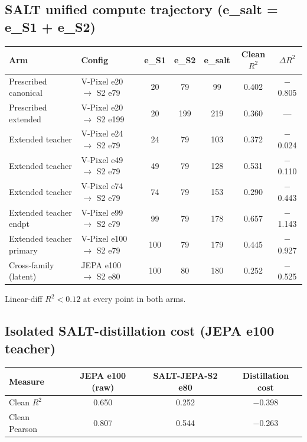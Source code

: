 \documentclass{article}
\begin{document}
\subsection{SALT unified compute trajectory (e\_salt = e\_S1 + e\_S2)}

\begin{center}
\begin{tabular}{llccccc}
\toprule
Arm & Config & e\_S1 & e\_S2 & e\_salt & Clean $R^2$ & $\Delta R^2$ \\
\midrule
Prescribed canonical & V-Pixel e20 $\to$ S2 e79 & 20 & 79 & 99  & 0.402 & $-$0.805 \\
Prescribed extended  & V-Pixel e20 $\to$ S2 e199 & 20 & 199 & 219 & 0.360 & --- \\
Extended teacher     & V-Pixel e24 $\to$ S2 e79 & 24 & 79 & 103 & 0.372 & $-$0.024 \\
Extended teacher     & V-Pixel e49 $\to$ S2 e79 & 49 & 79 & 128 & 0.531 & $-$0.110 \\
Extended teacher     & V-Pixel e74 $\to$ S2 e79 & 74 & 79 & 153 & 0.290 & $-$0.443 \\
Extended teacher endpt & V-Pixel e99 $\to$ S2 e79 & 99 & 79 & 178 & 0.657 & $-$1.143 \\
Extended teacher primary & V-Pixel e100 $\to$ S2 e79 & 100 & 79 & 179 & 0.445 & $-$0.927 \\
Cross-family (latent) & JEPA e100 $\to$ S2 e80 & 100 & 80 & 180 & 0.252 & $-$0.525 \\
\bottomrule
\end{tabular}
\end{center}

Linear-diff $R^2 < 0.12$ at every point in both arms.

\subsection{Isolated SALT-distillation cost (JEPA e100 teacher)}

\begin{center}
\begin{tabular}{lccc}
\toprule
Measure & JEPA e100 (raw) & SALT-JEPA-S2 e80 & Distillation cost \\
\midrule
Clean $R^2$ & 0.650 & 0.252 & $-$0.398 \\
Clean Pearson & 0.807 & 0.544 & $-$0.263 \\
\bottomrule
\end{tabular}
\end{center}
\end{document}
